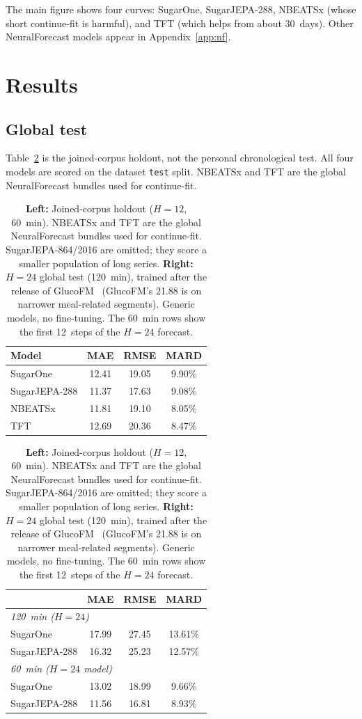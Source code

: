 \documentclass[11pt,a4paper]{article}
\begin{document}
The main figure shows four curves: SugarOne, SugarJEPA-288, NBEATSx (whose
short continue-fit is harmful), and TFT (which helps from about 30~days).
Other NeuralForecast models appear in Appendix~\ref{app:nf}.

\section{Results}
\label{sec:results}

\subsection{Global test}
\label{sec:global}

Table~\ref{tab:global} is the joined-corpus holdout, not the personal
chronological test. All four models are scored on the dataset
\texttt{test} split. NBEATSx and TFT are the global NeuralForecast bundles
used for continue-fit.

\begin{table}[t]
\centering
\small
\begin{minipage}[t]{0.48\textwidth}
\centering
\begin{tabular}{lccc}
\toprule
Model & MAE & RMSE & MARD \\
\midrule
SugarOne & 12.41 & 19.05 & 9.90\% \\
SugarJEPA-288 & 11.37 & 17.63 & 9.08\% \\
NBEATSx & 11.81 & 19.10 & 8.05\% \\
TFT & 12.69 & 20.36 & 8.47\% \\
\bottomrule
\end{tabular}
\end{minipage}
\hfill
\begin{minipage}[t]{0.48\textwidth}
\centering
\begin{tabular}{lccc}
\toprule
 & MAE & RMSE & MARD \\
\midrule
\multicolumn{4}{l}{\textit{120~min (\(H\!=\!24\))}} \\
SugarOne & 17.99 & 27.45 & 13.61\% \\
SugarJEPA-288 & 16.32 & 25.23 & 12.57\% \\
\midrule
\multicolumn{4}{l}{\textit{60~min (\(H\!=\!24\) model)}} \\
SugarOne & 13.02 & 18.99 & 9.66\% \\
SugarJEPA-288 & 11.56 & 16.81 & 8.93\% \\
\bottomrule
\end{tabular}
\end{minipage}
\caption{\textbf{Left:} Joined-corpus holdout (\(H\!=\!12\), 60~min).
NBEATSx and TFT are the global NeuralForecast bundles used for continue-fit.
SugarJEPA-864/2016 are omitted; they score a smaller population of long
series.
\textbf{Right:} \(H\!=\!24\) global test (120~min), trained after the
release of GlucoFM~\citep{li2026glucofm} (GlucoFM's 21.88 is on narrower
meal-related segments). Generic models, no fine-tuning. The 60~min rows
show the first 12~steps of the \(H\!=\!24\) forecast.}
\label{tab:global}
\end{table}
\end{document}

